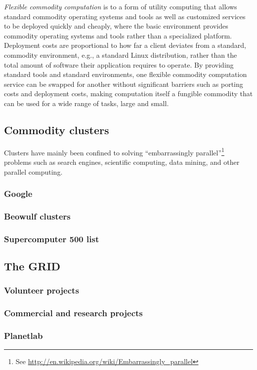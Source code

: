 \emph{Flexible commodity computation} is to a form of utility computing that allows standard commodity operating systems and tools as well as customized services to be deployed quickly and cheaply, where the basic environment provides commodity operating systems and tools rather than a specialized platform. Deployment costs are proportional to how far a client deviates from a standard, commodity environment, e.g., a standard Linux distribution, rather than the total amount of software their application requires to operate. By providing standard tools and standard environments, one flexible commodity computation service can be swapped for another without significant barriers such as porting costs and deployment costs, making computation itself a fungible commodity that can be used for a wide range of tasks, large and small.

\subsection{Commodity clusters}

Clusters have mainly been confined to solving ``embarrassingly parallel''\footnote{See \url{http://en.wikipedia.org/wiki/Embarrassingly_parallel}} problems such as search engines, scientific computing, data mining, and other parallel computing.


\subsubsection{Google}
\subsubsection{Beowulf clusters}
\subsubsection{Supercomputer 500 list}

\subsection{The GRID}
\subsubsection{Volunteer projects}
\subsubsection{Commercial and research projects}
\subsubsection{Planetlab}

